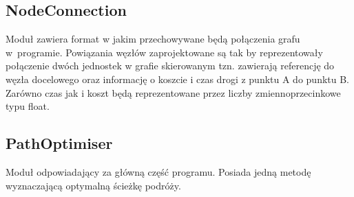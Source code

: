 \documentclass[10pt,oneside]{article}
\begin{document}
\subsection{NodeConnection}
Moduł zawiera format w jakim przechowywane będą połączenia grafu w~programie. Powiązania węzłów zaprojektowane są tak by reprezentowały połączenie dwóch jednostek w grafie skierowanym tzn. zawierają referencję do węzła docelowego oraz informację o koszcie i czas drogi z punktu A do punktu B. Zarówno czas jak i koszt będą reprezentowane przez liczby zmiennoprzecinkowe typu float. 
\subsection{PathOptimiser}
Moduł odpowiadający za główną część programu. Posiada jedną metodę wyznaczającą optymalną ścieżkę podróży.
\end{document}
